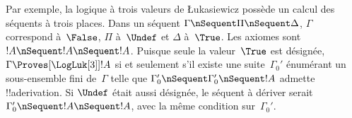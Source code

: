 \documentclass[../../../include/open-logic-section]{subfiles}
\begin{document}
Par exemple, la logique à trois valeurs de \L ukasiewicz possède un
calcul des séquents à trois places. Dans un séquent
$\Gamma \nSequent \Pi \nSequent \Delta$, $\Gamma$ correspond
à~$\False$, $\Pi$ à~$\Undef$ et $\Delta$ à~$\True$. Les axiomes sont
$!A \nSequent !A \nSequent !A$. Puisque seule la valeur~$\True$ est désignée,
$\Gamma\Proves[\LogLuk[3]] !A$ si et seulement s'il existe une
suite~$\Gamma_0'$ énumérant un sous-ensemble fini de~$\Gamma$
telle que $\Gamma_0' \nSequent \Gamma_0' \nSequent !A$ admette
!!a{derivation}. Si $\Undef$ était aussi désignée, le séquent à
dériver serait $\Gamma_0' \nSequent !A \nSequent !A$, avec la même
condition sur~$\Gamma_0'$.
\end{document}
